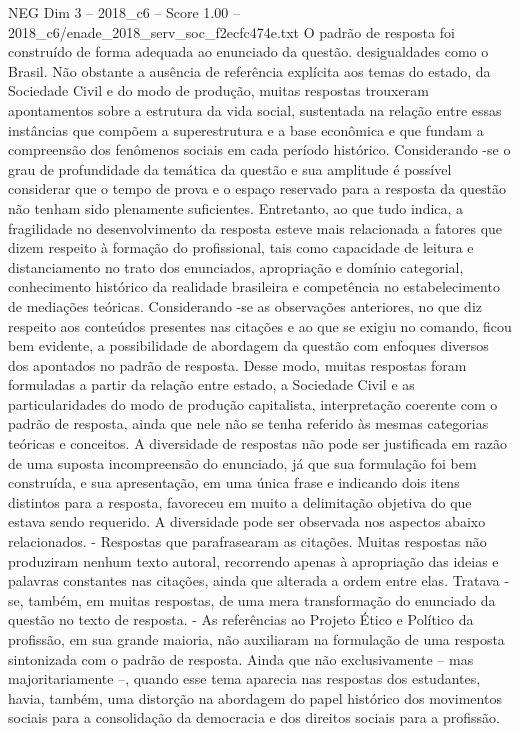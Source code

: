 \begin{textsample}{NEG Dim 3 – 2018\_c6 – Score 1.00 – 2018\_c6/enade\_2018\_serv\_soc\_f2ecfc474e.txt}
O padrão de resposta foi construído de forma adequada ao enunciado da questão. desigualdades como o Brasil.
Não obstante a ausência de referência explícita aos temas do estado, da Sociedade Civil e do modo de produção, muitas respostas trouxeram apontamentos sobre a estrutura da vida social, sustentada na relação entre essas instâncias que compõem a superestrutura e a base econômica e que fundam a compreensão dos fenômenos sociais em cada período histórico.
Considerando -se o grau de profundidade da temática da questão e sua amplitude é possível considerar que o tempo de prova e o espaço reservado para a resposta da questão não tenham sido plenamente suficientes.
Entretanto, ao que tudo indica, a fragilidade no desenvolvimento da resposta esteve mais relacionada a fatores que dizem respeito à formação do profissional, tais como capacidade de leitura e distanciamento no trato dos enunciados, apropriação e domínio categorial, conhecimento histórico da realidade brasileira e competência no estabelecimento de mediações teóricas.
Considerando -se as observações anteriores, no que diz respeito aos conteúdos presentes nas citações e ao que se exigiu no comando, ficou bem evidente, a possibilidade de abordagem da questão com enfoques diversos dos apontados no padrão de resposta.
Desse modo, muitas respostas foram formuladas a partir da relação entre estado, a Sociedade Civil e as particularidades do modo de produção capitalista, interpretação coerente com o padrão de resposta, ainda que nele não se tenha referido às mesmas categorias teóricas e conceitos.
A diversidade de respostas não pode ser justificada em razão de uma suposta incompreensão do enunciado, já que sua formulação foi bem construída, e sua apresentação, em uma única frase e indicando dois itens distintos para a resposta, favoreceu em muito a delimitação objetiva do que estava sendo requerido.
A diversidade pode ser observada nos aspectos abaixo relacionados. - Respostas que parafrasearam as citações.
Muitas respostas não produziram nenhum texto autoral, recorrendo apenas à apropriação das ideias e palavras constantes nas citações, ainda que alterada a ordem entre elas.
Tratava -se, também, em muitas respostas, de uma mera transformação do enunciado da questão no texto de resposta. - As referências ao Projeto Ético e Político da profissão, em sua grande maioria, não auxiliaram na formulação de uma resposta sintonizada com o padrão de resposta.
Ainda que não exclusivamente – mas majoritariamente –, quando esse tema aparecia nas respostas dos estudantes, havia, também, uma distorção na abordagem do papel histórico dos movimentos sociais para a consolidação da democracia e dos direitos sociais para a profissão.

\end{textsample}
